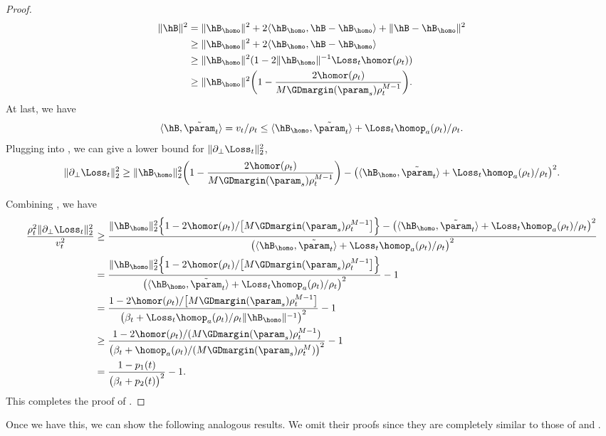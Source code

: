 \begin{proof}
\begin{align}
     \|\hB\|^2 & = \|\hB_{\homo}\|^2 + 2 \langle \hB_{\homo}, \hB - \hB_{\homo} \rangle + \|\hB -\hB_{\homo}\|^2 \notag   \\
     &\ge \|\hB_{\homo}\|^2 + 2 \langle \hB_{\homo}, \hB - \hB_{\homo} \rangle \notag\\ 
     &\ge \|\hB_{\homo}\|^2(1 - 2\|\hB_{\homo}\|^{-1} \Loss_t\homor (\rho_t)) \notag\\ 
     &\ge  \|\hB_{\homo}\|^2 \bigg(1 -\frac{ 2 \homor (\rho_t)}{M\GDmargin(\param_s) \rho_t^{M-1}} \bigg) .\label{eq: beta-bound-num1-GD}
\end{align}
At last, we have 
\begin{equation}
\label{eq: beta-bound-num2-GD}
      \langle \hB, \tilde \param_t  \rangle  = v_t/\rho_t \le  \langle \hB_{\homo}, \tilde{\param}_t  \rangle + \Loss_t \homop_a(\rho_t) / \rho_t.
\end{equation}
Plugging   into , we can give a lower bound for $\|\partial_\perp \Loss_t\|_2^2$, 
\begin{equation}
\label{eq:bound-nabla-Lt}
\|\partial_\perp \Loss_t\|_2^2 \ge \|\hB_{\homo}\|_2^2 \bigg(1 -\frac{ 2 \homor (\rho_t)}{M\GDmargin(\param_s) \rho_t^{M-1}} \bigg)  - \big( \langle \hB_{\homo}, \tilde{\param}_t  \rangle + \Loss_t \homop_a(\rho_t) / \rho_t \big)^2. 
\end{equation}


Combining , we have 
\begin{align*}
    \frac{\rho_t^2\|\partial_\perp \Loss_t\|_2^2}{v_t^2 } &\ge  \frac{\|\hB_{\homo}\|_2^2 \Big\{1 -  2 \homor(\rho_t)/ \big[M\GDmargin(\param_s) \rho_t^{M-1}\big] \Big\}- \big( \langle \hB_{\homo}, \tilde{\param}_t  \rangle + \Loss_t \homop_a(\rho_t) / \rho_t \big)^2 }{ \big(\langle \hB_{\homo}, \tilde{\param}_t  \rangle + \Loss_t \homop_a(\rho_t) / \rho_t\big)^2}\\
    & = \frac{\|\hB_{\homo}\|_2^2 \Big\{1 -  2 \homor(\rho_t)/ \big[M\GDmargin(\param_s) \rho_t^{M-1}\big] \Big\}  }{ \big(\langle \hB_{\homo}, \tilde{\param}_t  \rangle + \Loss_t \homop_a(\rho_t) / \rho_t\big)^2} - 1\\ 
    & = \frac{1 -  2 \homor(\rho_t)/ \big[M\GDmargin(\param_s) \rho_t^{M-1}\big]  }{\big( \beta_t + \Loss_t \homop_a(\rho_t) / \rho_t \|\hB_{\homo}\|^{-1} \big)^2} - 1\\ 
    &\ge  \frac{1- 2 \homor(\rho_t)/(M\GDmargin(\param_s) \rho^{M-1}_t)}{\big( \beta_t +  \homop_a(\rho_t) / (M\GDmargin(\param_s) \rho^{M}_t) \big)^2} - 1\\ 
    & = \frac{1-p_1(t)}{\big(\beta_t + p_2(t)\big)^2}-1 . 
\end{align*}
This completes the proof of .
\end{proof}
Once we have this, we can show the following analogous results. We omit their proofs since they are completely similar to those of  and .

